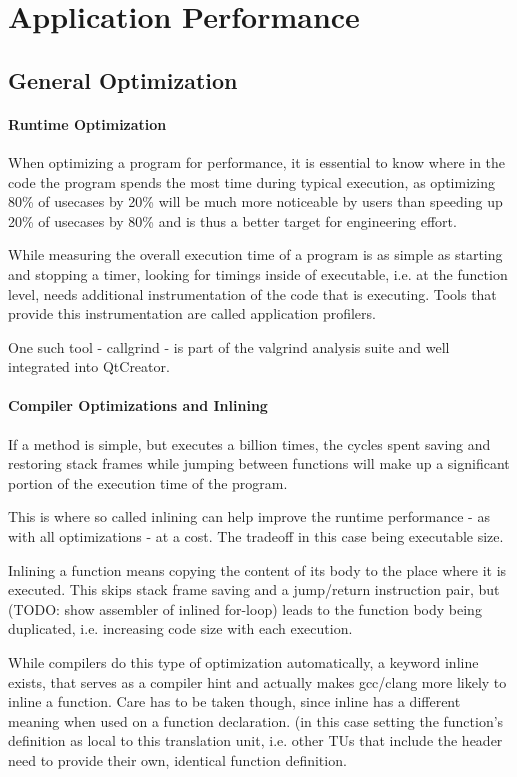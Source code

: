 \chapter{Application Performance}

\section{General Optimization}
\subsubsection{Runtime Optimization}
When optimizing a program for performance, it is essential to know where in the code the program spends the most time during typical execution, as optimizing 80\% of usecases by 20\% will be much more noticeable by users than speeding up 20\% of usecases by 80\% and is thus a better target for engineering effort.

While measuring the overall execution time of a program is as simple as starting and stopping a timer, looking for timings inside of executable, i.e. at the function level, needs additional instrumentation of the code that is executing. Tools that provide this instrumentation are called application profilers.


One such tool - callgrind - is part of the valgrind analysis suite and well integrated into QtCreator.

\subsubsection{Compiler Optimizations and Inlining}
If a method is simple, but executes a billion times, the cycles spent saving and restoring stack frames while jumping between functions will make up a significant portion of the execution time of the program.

This is where so called inlining can help improve the runtime performance - as with all optimizations - at a cost. The tradeoff in this case being executable size.

Inlining a function means copying the content of its body to the place where it is executed. This skips stack frame saving and a jump/return instruction pair, but (TODO: show assembler of inlined for-loop) leads to the function body being duplicated, i.e. increasing code size with each execution.

While compilers do this type of optimization automatically, a keyword inline exists, that serves as a compiler hint and actually makes gcc/clang more likely to inline a function. Care has to be taken though, since inline has a different meaning when used on a function declaration. (in this case setting the function's definition as local to this translation unit, i.e. other TUs that include the header need to provide their own, identical function definition.

